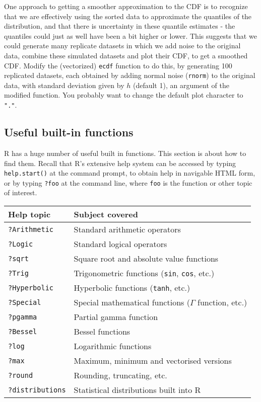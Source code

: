 \documentclass[10pt] {article}
\theoremstyle{definition}
\begin{document}
 One approach to getting a smoother approximation to the CDF is to recognize that we are effectively using the sorted data to approximate the quantiles of the distribution, and that there is uncertainty in these quantile estimates - the quantiles could just as well have been  a bit higher or lower. This suggests that we could generate many replicate datasets in which we add noise to the original data, combine these simulated datasets and plot their CDF, to get a smoothed CDF. Modify the (vectorized) {\tt ecdf} function to do this, by generating 100 replicated datasets, each obtained by adding normal noise ({\tt rnorm}) to the original data, with standard deviation given by $h$ (default 1), an argument of the modified function. You probably want to change the default plot character to \lstinline+"."+.   


\subsection{Useful built-in functions}

R has a huge number of useful built in functions. This section is about how to find them.  Recall that R's extensive help system can be accessed by typing {\lstinline+help.start()+} at the command prompt, to obtain help in navigable HTML form, or by typing {\lstinline+?foo+} at the command line, where {\lstinline+foo+} is the function or other topic of interest. 

\begin{center}
\begin{tabular}{ll}
{Help topic} & {Subject covered} \\ \hline
{\tt ?Arithmetic} & Standard arithmetic operators \\
{\tt ?Logic} & Standard logical operators \\
{\tt ?sqrt} & Square root and absolute value functions \\
{\tt ?Trig} & Trigonometric functions ({\lstinline+sin+}, {\lstinline+cos+}, etc.) \\
{\tt ?Hyperbolic} & Hyperbolic functions ({\lstinline+tanh+}, etc.) \\
{\tt ?Special} & Special mathematical functions ($\Gamma$ function, etc.)\\
{\tt ?pgamma} & Partial gamma function\\
{\tt ?Bessel} & Bessel functions\\
{\tt ?log} & Logarithmic functions\\
{\tt ?max} & Maximum, minimum and vectorised versions\\
{\tt ?round} & Rounding, truncating, etc.\\
{\tt ?distributions} & Statistical distributions built into R\\ \hline 
\end{tabular} 
\end{center}
\end{document}
